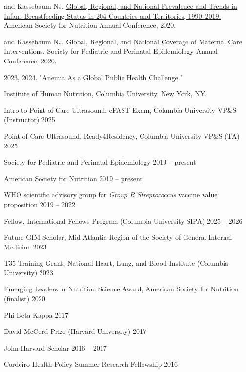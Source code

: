 \documentclass[11pt,article,oneside]{memoir}
\begin{document}
 and Kassebaum NJ. \href{https://doi.org/10.1093/cdn/nzaa054_064}{Global, Regional, and National Prevalence and Trends in Infant Breastfeeding Status in 204 Countries and Territories, 1990--2019.} 
American Society for Nutrition Annual Conference, 2020.

 and Kassebaum NJ. Global, Regional, and National Coverage of Maternal Care
Interventions. Society for Pediatric and Perinatal Epidemiology Annual Conference, 2020. 

\bigskip 

\medskip

 2023, 2024. "Anemia As a Global Public Health Challenge." 

\indent \indent Institute of Human Nutrition, Columbia University, New York, NY.

\bigskip 

\medskip

\ind Intro to Point-of-Care Ultrasound: eFAST Exam, Columbia University VP\&S (Instructor) \hfill 2025 

\ind Point-of-Care Ultrasound, Ready4Residency, Columbia University VP\&S (TA) \hfill 2025

\bigskip

\medskip

\ind Society for Pediatric and Perinatal Epidemiology \hfill 2019 -- present

\ind American Society for Nutrition \hfill 2019 -- present

\ind WHO scientific advisory group for \emph{Group B Streptococcus} vaccine value proposition \hfill 2019 -- 2022

\bigskip


\medskip

\ind Fellow, International Fellows Program (Columbia University SIPA) \hfill 2025 -- 2026

\ind Future GIM Scholar, Mid-Atlantic Region of the Society of General Internal Medicine \hfill 2023

\ind T35 Training Grant, National Heart, Lung, and Blood Institute (Columbia University) \hfill 2023

\ind Emerging Leaders in Nutrition Science Award, American Society for Nutrition (finalist) \hfill 2020

\ind Phi Beta Kappa \hfill 2017

\ind David McCord Prize (Harvard University) \hfill 2017

\ind John Harvard Scholar \hfill 2016 -- 2017

\ind Cordeiro Health Policy Summer Research Fellowship \hfill 2016

\bigskip
\end{document}
